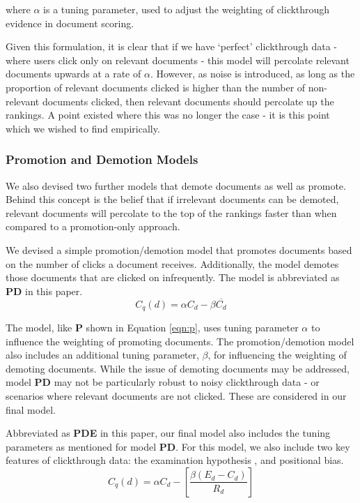 \noindent
where $\alpha$ is a tuning parameter, used to adjust the weighting of clickthrough evidence in document scoring.

Given this formulation, it is clear that if we have `perfect' clickthrough data - where users click only on relevant documents - this model will percolate relevant documents upwards at a rate of $\alpha$. However, as noise is introduced, as long as the proportion of relevant documents clicked is higher than the number of non-relevant documents clicked, then relevant documents should percolate up the rankings. A point existed where this was no longer the case - it is this point which we wished to find empirically.

\subsubsection{Promotion and Demotion Models}
We also devised two further models that demote documents as well as promote. Behind this concept is the belief that if irrelevant documents can be demoted, relevant documents will percolate to the top of the rankings faster than when compared to a promotion-only approach.

We devised a simple promotion/demotion model that promotes documents based on the number of clicks a document receives. Additionally, the model demotes those documents that are clicked on infrequently. The model is abbreviated as \textbf{PD} in this paper.
\vskip -0.3cm
\begin{equation}
	C_q(d) = \alpha C_d - \beta \overline{C_d}
	\label{eqn:pd}
\end{equation}

The model, like \textbf{P} shown in Equation \ref{eqn:p}, uses tuning parameter $\alpha$ to influence the weighting of promoting documents. The promotion/demotion model also includes an additional tuning parameter, $\beta$, for influencing the weighting of demoting documents. While the issue of demoting documents may be addressed, model \textbf{PD} may not be particularly robust to noisy clickthrough data - or scenarios where relevant documents are not clicked. These are considered in our final model.

Abbreviated as \textbf{PDE} in this paper, our final model also includes the tuning parameters as mentioned for model \textbf{PD}. For this model, we also include two key features of clickthrough data: the examination hypothesis \cite{craswell2008click_position_bias_models}, and positional bias.
\vspace{-0.1cm}
\begin{equation}
	C_q(d) = \alpha C_d - \left[\frac{\beta(E_d - C_d)}{R_d}\right]
	\label{eqn:pde}
\end{equation}

